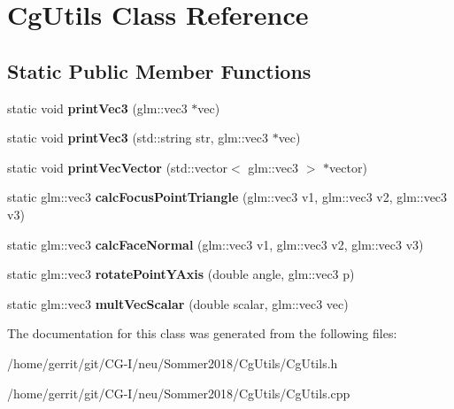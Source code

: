 \hypertarget{class_cg_utils}{}\section{Cg\+Utils Class Reference}
\label{class_cg_utils}
\subsection*{Static Public Member Functions}
\begin{DoxyCompactItemize}
\item 
\mbox{\label{class_cg_utils_a4a1912ceb0084f36047ff303d9a98e47}} 
static void {\bfseries print\+Vec3} (glm\+::vec3 $\ast$vec)
\item 
\mbox{\label{class_cg_utils_a01d2489a41f0072ff1a2da99ee19d7ec}} 
static void {\bfseries print\+Vec3} (std\+::string str, glm\+::vec3 $\ast$vec)
\item 
\mbox{\label{class_cg_utils_a69a7acb3151049093565693eed078116}} 
static void {\bfseries print\+Vec\+Vector} (std\+::vector$<$ glm\+::vec3 $>$ $\ast$vector)
\item 
\mbox{\label{class_cg_utils_a8d9f0abc674f7bc0e518cad38cd0a19a}} 
static glm\+::vec3 {\bfseries calc\+Focus\+Point\+Triangle} (glm\+::vec3 v1, glm\+::vec3 v2, glm\+::vec3 v3)
\item 
\mbox{\label{class_cg_utils_ac0af13b463e78f3467dbb60fdfa5bbac}} 
static glm\+::vec3 {\bfseries calc\+Face\+Normal} (glm\+::vec3 v1, glm\+::vec3 v2, glm\+::vec3 v3)
\item 
\mbox{\label{class_cg_utils_ac4798c87fd0424ee8e75cf5170b5f7b7}} 
static glm\+::vec3 {\bfseries rotate\+Point\+Y\+Axis} (double angle, glm\+::vec3 p)
\item 
\mbox{\label{class_cg_utils_a726e54de3d8bf2d88c065f9a7b586678}} 
static glm\+::vec3 {\bfseries mult\+Vec\+Scalar} (double scalar, glm\+::vec3 vec)
\end{DoxyCompactItemize}


The documentation for this class was generated from the following files\+:\begin{DoxyCompactItemize}
\item 
/home/gerrit/git/\+C\+G-\/\+I/neu/\+Sommer2018/\+Cg\+Utils/Cg\+Utils.\+h\item 
/home/gerrit/git/\+C\+G-\/\+I/neu/\+Sommer2018/\+Cg\+Utils/Cg\+Utils.\+cpp\end{DoxyCompactItemize}
